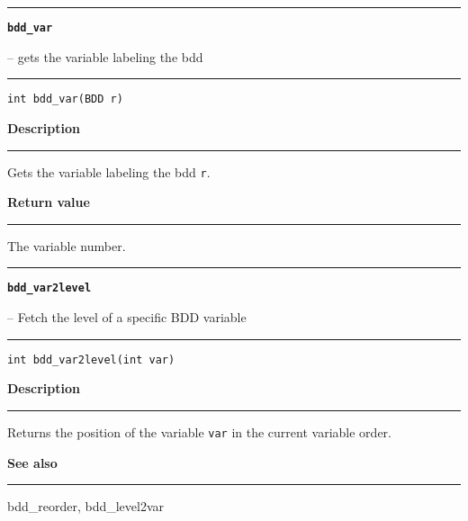 \begin{minipage}{\textwidth}

\noindent\begin{minipage}{\textwidth}
\rule{\textwidth}{0.5mm}
{\tt\bf bdd\_var }
\--- gets the variable labeling the bdd  \hspace{\fill}
\\\rule[1.5ex]{\textwidth}{0.5mm}
\end{minipage}

\noindent\begin{verbatim}
int bdd_var(BDD r) 
\end{verbatim}

\vspace{\parsep}\noindent
{\bf Description}\\\rule[1.5ex]{\textwidth}{0.2mm}\vspace{-1.5ex}\setlength{\parindent}{1em}
Gets the variable labeling the bdd {\tt r}. 

\setlength{\parindent}{0em}\vspace{\parsep}\vspace{\baselineskip}\noindent
{\bf Return value}\\\rule[1.5ex]{\textwidth}{0.2mm}\vspace{-1.5ex}
The variable number. 
\end{minipage}
\vspace{8ex}
\begin{minipage}{\textwidth}

\noindent\begin{minipage}{\textwidth}
\rule{\textwidth}{0.5mm}
{\tt\bf bdd\_var2level }
\--- Fetch the level of a specific BDD variable  \hspace{\fill}
\\\rule[1.5ex]{\textwidth}{0.5mm}
\end{minipage}

\noindent\begin{verbatim}
int bdd_var2level(int var) 
\end{verbatim}

\vspace{\parsep}\noindent
{\bf Description}\\\rule[1.5ex]{\textwidth}{0.2mm}\vspace{-1.5ex}\setlength{\parindent}{1em}
Returns the position of the variable {\tt var} in the current
           variable order. 

\vspace{\parsep}\vspace{\baselineskip}\noindent
{\bf See also}\\\rule[1.5ex]{\textwidth}{0.2mm}\vspace{-1.5ex}
bdd\_reorder, bdd\_level2var 
\end{minipage}
